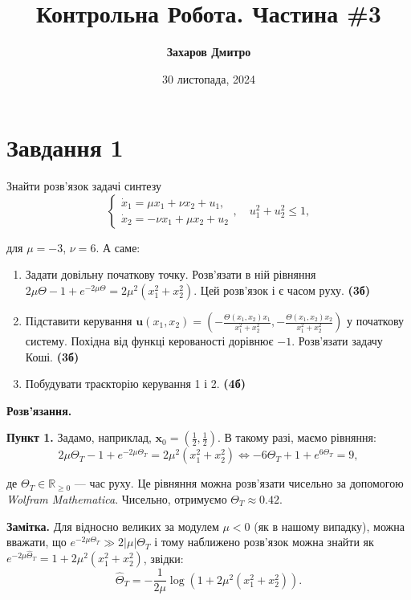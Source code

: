 \documentclass{hw_template}
\title{\bfseries Контрольна Робота. Частина \#3}
\author{\bfseries Захаров Дмитро}
\date{30 листопада, 2024}
\begin{document}
\pagestyle{fancy}

\maketitle

\section{Завдання 1}

\begin{problem}
    Знайти розв’язок задачі синтезу
    \begin{equation*}
        \begin{cases}
            \dot{x}_1 = \mu x_1 + \nu x_2 + u_1, \\
            \dot{x}_2 = -\nu x_1 + \mu x_2 + u_2
        \end{cases}, \quad u_1^2 + u_2^2 \leq 1,
    \end{equation*}

    для $\mu=-3$, $\nu=6$. А саме:
    \begin{enumerate}
        \item Задати довільну початкову точку. Розв’язати в ній рівняння
        $2\mu\Theta-1+e^{-2\mu\Theta}=2\mu^2(x_1^2+x_2^2)$. Цей розв’язок і є
        часом руху. \textbf{(3б)}
        \item Підставити керування $\mathbf{u}(x_1,x_2)=\left(-\frac{\Theta(x_1,x_2)x_1}{x_1^2+x_2^2}, -\frac{\Theta(x_1,x_2)x_2}{x_1^2+x_2^2}\right)$ у початкову систему. Похідна 
        від функці керованості дорівнює $-1$. Розв'язати задачу Коші. \textbf{(3б)}
        \item Побудувати траєкторію керування 1 і 2. \textbf{(4б)}
    \end{enumerate}
\end{problem}

\textbf{Розв'язання.}

\textbf{Пункт 1.} Задамо, наприклад, $\mathbf{x}_0 = \left(\frac{1}{2}, \frac{1}{2}\right)$. В такому разі, маємо рівняння:
\begin{equation*}
    2\mu\Theta_T-1+e^{-2\mu\Theta_T}=2\mu^2(x_1^2+x_2^2) \iff -6\Theta_T+1+e^{6\Theta_T} = 9,
\end{equation*}

де $\Theta_T \in \mathbb{R}_{\geq 0}$ --- час руху. Це рівняння можна розв'язати
чисельно за допомогою \textit{Wolfram Mathematica}. Чисельно, отримуємо $\Theta_T \approx
0.42$. 

\textbf{Замітка.} Для відносно великих за модулем $\mu<0$ (як в нашому випадку),
можна вважати, що $e^{-2\mu\Theta_T} \gg 2|\mu|\Theta_T$ і тому наближено розв'язок 
можна знайти як $e^{-2\mu\hat{\Theta}_T} = 1+2\mu^2(x_1^2+x_2^2)$, звідки:
\begin{equation*}
    \hat{\Theta}_T = -\frac{1}{2\mu}\log(1+2\mu^2(x_1^2+x_2^2)).
\end{equation*}
\end{document}
